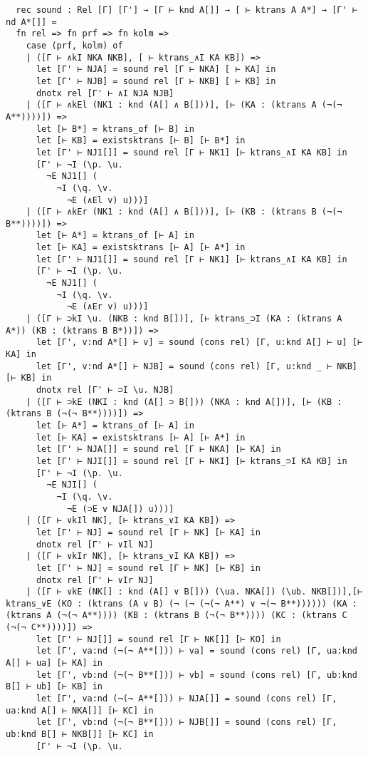 \documentclass{article}
\begin{document}
\begin{lstlisting}
  rec sound : Rel [Γ] [Γ'] → [Γ ⊢ knd A[]] → [ ⊢ ktrans A A*] → [Γ' ⊢ nd A*[]] =
  fn rel => fn prf => fn kolm =>
    case (prf, kolm) of
    | ([Γ ⊢ ∧kI NKA NKB], [ ⊢ ktrans_∧I KA KB]) =>
      let [Γ' ⊢ NJA] = sound rel [Γ ⊢ NKA] [ ⊢ KA] in
      let [Γ' ⊢ NJB] = sound rel [Γ ⊢ NKB] [ ⊢ KB] in
      dnotx rel [Γ' ⊢ ∧I NJA NJB]
    | ([Γ ⊢ ∧kEl (NK1 : knd (A[] ∧ B[]))], [⊢ (KA : (ktrans A (¬(¬ A**))))]) =>
      let [⊢ B*] = ktrans_of [⊢ B] in
      let [⊢ KB] = existsktrans [⊢ B] [⊢ B*] in
      let [Γ' ⊢ NJ1[]] = sound rel [Γ ⊢ NK1] [⊢ ktrans_∧I KA KB] in
      [Γ' ⊢ ¬I (\p. \u.
        ¬E NJ1[] (
          ¬I (\q. \v.
            ¬E (∧El v) u)))]
    | ([Γ ⊢ ∧kEr (NK1 : knd (A[] ∧ B[]))], [⊢ (KB : (ktrans B (¬(¬ B**))))]) =>
      let [⊢ A*] = ktrans_of [⊢ A] in
      let [⊢ KA] = existsktrans [⊢ A] [⊢ A*] in
      let [Γ' ⊢ NJ1[]] = sound rel [Γ ⊢ NK1] [⊢ ktrans_∧I KA KB] in
      [Γ' ⊢ ¬I (\p. \u.
        ¬E NJ1[] (
          ¬I (\q. \v.
            ¬E (∧Er v) u)))]
    | ([Γ ⊢ ⊃kI \u. (NKB : knd B[])], [⊢ ktrans_⊃I (KA : (ktrans A A*)) (KB : (ktrans B B*))]) =>
      let [Γ', v:nd A*[] ⊢ v] = sound (cons rel) [Γ, u:knd A[] ⊢ u] [⊢ KA] in
      let [Γ', v:nd A*[] ⊢ NJB] = sound (cons rel) [Γ, u:knd _ ⊢ NKB] [⊢ KB] in
      dnotx rel [Γ' ⊢ ⊃I \u. NJB]
    | ([Γ ⊢ ⊃kE (NKI : knd (A[] ⊃ B[])) (NKA : knd A[])], [⊢ (KB : (ktrans B (¬(¬ B**))))]) =>
      let [⊢ A*] = ktrans_of [⊢ A] in
      let [⊢ KA] = existsktrans [⊢ A] [⊢ A*] in
      let [Γ' ⊢ NJA[]] = sound rel [Γ ⊢ NKA] [⊢ KA] in
      let [Γ' ⊢ NJI[]] = sound rel [Γ ⊢ NKI] [⊢ ktrans_⊃I KA KB] in
      [Γ' ⊢ ¬I (\p. \u.
        ¬E NJI[] (
          ¬I (\q. \v. 
            ¬E (⊃E v NJA[]) u)))]
    | ([Γ ⊢ ∨kIl NK], [⊢ ktrans_∨I KA KB]) =>
      let [Γ' ⊢ NJ] = sound rel [Γ ⊢ NK] [⊢ KA] in
      dnotx rel [Γ' ⊢ ∨Il NJ]
    | ([Γ ⊢ ∨kIr NK], [⊢ ktrans_∨I KA KB]) =>
      let [Γ' ⊢ NJ] = sound rel [Γ ⊢ NK] [⊢ KB] in
      dnotx rel [Γ' ⊢ ∨Ir NJ]
    | ([Γ ⊢ ∨kE (NK[] : knd (A[] ∨ B[])) (\ua. NKA[]) (\ub. NKB[])],[⊢ ktrans_∨E (KO : (ktrans (A ∨ B) (¬ (¬ (¬(¬ A**) ∨ ¬(¬ B**)))))) (KA : (ktrans A (¬(¬ A**)))) (KB : (ktrans B (¬(¬ B**)))) (KC : (ktrans C (¬(¬ C**))))]) =>
      let [Γ' ⊢ NJ[]] = sound rel [Γ ⊢ NK[]] [⊢ KO] in
      let [Γ', va:nd (¬(¬ A**[])) ⊢ va] = sound (cons rel) [Γ, ua:knd A[] ⊢ ua] [⊢ KA] in
      let [Γ', vb:nd (¬(¬ B**[])) ⊢ vb] = sound (cons rel) [Γ, ub:knd B[] ⊢ ub] [⊢ KB] in
      let [Γ', va:nd (¬(¬ A**[])) ⊢ NJA[]] = sound (cons rel) [Γ, ua:knd A[] ⊢ NKA[]] [⊢ KC] in
      let [Γ', vb:nd (¬(¬ B**[])) ⊢ NJB[]] = sound (cons rel) [Γ, ub:knd B[] ⊢ NKB[]] [⊢ KC] in
      [Γ' ⊢ ¬I (\p. \u.

\end{lstlisting}
\end{document}
